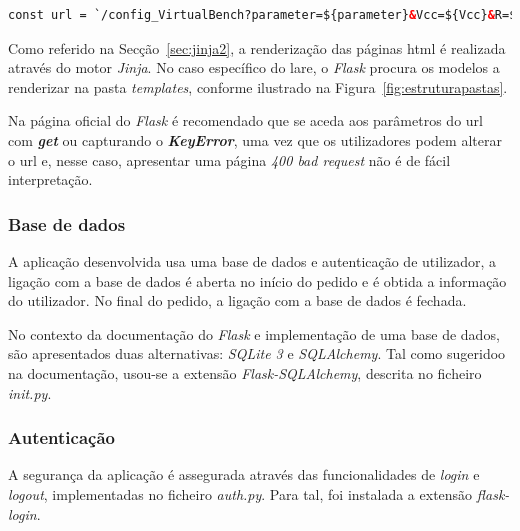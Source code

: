 \begin{minipage}{0.9\linewidth}
	\begin{lstlisting}[language=Html, caption=Exemplo argumentos passados ao servidor - ohm.html, label=lst:paramurl]
const url = `/config_VirtualBench?parameter=${parameter}&Vcc=${Vcc}&R=${Resistance}`;
\end{lstlisting}
\end{minipage}

Como referido na Secção~\ref{sec:jinja2}, a renderização das páginas \acrshort{html} é realizada através do motor \textit{Jinja}. No caso específico do \acrshort{lare}, o \textit{Flask} procura os modelos a renderizar na pasta \textit{templates}, conforme ilustrado na Figura~\ref{fig:estruturapastas}. 

Na página oficial do \textit{Flask} é recomendado que se aceda aos parâmetros do \acrshort{url} com \textit{\textbf{get}} ou capturando o \textit{\textbf{KeyError}}, uma vez que os utilizadores podem alterar o \acrshort{url} e, nesse caso, apresentar uma página \textit{400 bad request} não é de fácil interpretação.

\subsubsection{Base de dados}
A aplicação desenvolvida usa uma base de dados e autenticação de utilizador, a ligação com a base de dados é aberta no início do pedido e é obtida a informação do utilizador. No final do pedido, a ligação com a base de dados é fechada.

No contexto da documentação do \textit{Flask} e implementação de uma base de dados, são apresentados duas alternativas: \textit{SQLite 3} e \textit{SQLAlchemy}. Tal como sugeridoo na documentação, usou-se a extensão \textit{Flask-SQLAlchemy}, descrita no ficheiro \textit{\textunderscore\textunderscore init.py\textunderscore\textunderscore}.

\subsubsection{Autenticação}
A segurança da aplicação é assegurada através das funcionalidades de \textit{login} e \textit{logout}, implementadas no ficheiro \textit{auth.py}. Para tal, foi instalada a extensão \textit{flask-login}.

